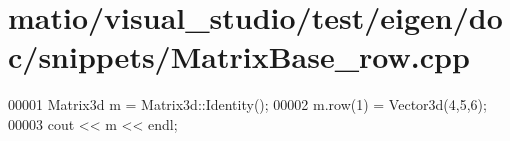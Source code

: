 \hypertarget{matio_2visual__studio_2test_2eigen_2doc_2snippets_2_matrix_base__row_8cpp_source}{}\section{matio/visual\+\_\+studio/test/eigen/doc/snippets/\+Matrix\+Base\+\_\+row.cpp}
\label{matio_2visual__studio_2test_2eigen_2doc_2snippets_2_matrix_base__row_8cpp_source}

\begin{DoxyCode}
00001 Matrix3d m = Matrix3d::Identity();
00002 m.row(1) = Vector3d(4,5,6);
00003 cout << m << endl;
\end{DoxyCode}
